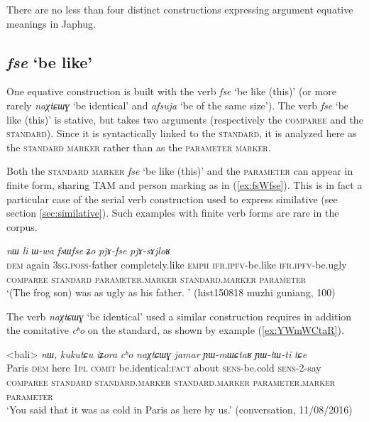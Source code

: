 \documentclass[oneside,a4paper,11pt]{article}
\newcommand{\ipa}[1]{{\phon\textit{#1}}}
\newcommand{\forme}[2]{\ipa{#1} `#2'}
\begin{document}
There are no less than four distinct constructions expressing argument equative meanings in Japhug. 

\subsection{\forme{fse}{be like}} \label{sec:fse}
One equative construction is built with the verb \forme{fse}{be like (this)} (or more rarely \forme{naχtɕɯɣ}{be identical} and \forme{afsuja}{be of the same size}). The verb \forme{fse}{be like (this)} is stative, but takes two arguments (respectively the \textsc{comparee} and the \textsc{standard}). Since it is syntactically linked to the \textsc{standard}, it is analyzed here as the \textsc{standard marker} rather than as the \textsc{parameter marker}.

Both  the \textsc{standard marker} \forme{fse}{be like (this)} and the \textsc{parameter} can appear in finite form, sharing TAM and person marking as in (\ref{ex:fsWfse}). This is in fact a particular case of the serial verb construction used to express similative (see section \ref{sec:similative}). Such examples with finite verb forms are rare in the corpus.

\begin{exe}
\ex \label{ex:fsWfse}
\glll
\ipa{nɯ} 	\ipa{li} 	\ipa{ɯ-wa} 	\ipa{fsɯfse} 	\ipa{ʑo} 	\ipa{pjɤ-fse} 	\ipa{pjɤ-sɤjloʁ} \\
\textsc{dem} again \textsc{3sg.poss}-father completely.like \textsc{emph} \textsc{ifr.ipfv}-be.like \textsc{ifr.ipfv}-be.ugly \\
\textsc{comparee} { } \textsc{standard} \textsc{parameter.marker} { } \textsc{standard.marker} \textsc{parameter} \\
\glt `(The frog son) was as ugly as his father. ' (hist150818 muzhi guniang, 100)
\end{exe}

The verb \forme{naχtɕɯɣ}{be identical} used a similar construction requires in addition the comitative \ipa{cʰo} on the standard, as shown by example (\ref{ex:YWmWCtaR}).

\begin{exe}
\ex \label{ex:YWmWCtaR}
\glll 
<bali> 	\ipa{nɯ,} 	{\ipa{kukutɕu} \ipa{iʑora}} 	\ipa{cʰo} 	\ipa{naχtɕɯɣ} 	\ipa{jamar} 	\ipa{ɲɯ-mɯɕtaʁ} 	\ipa{ɲɯ-tɯ-ti} 	\ipa{tɕe} \\
Paris \textsc{dem} {here \textsc{1pl}} \textsc{comit} be.identical:\textsc{fact} about \textsc{sens}-be.cold \textsc{sens}-2-say \\
\textsc{comparee} { }  \textsc{standard} \textsc{standard.marker} \textsc{standard.marker}  \textsc{parameter.marker} \textsc{parameter} \\
\glt `You said that it was as cold in Paris as here by us.' (conversation, 11/08/2016)
\end{exe}
\end{document}
